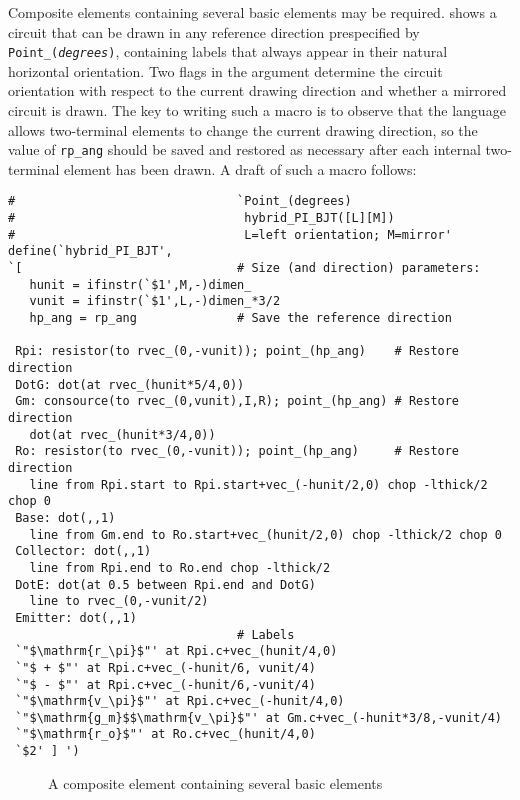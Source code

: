Composite elements containing several basic elements may be
required.   shows a circuit that can be drawn in
any reference direction prespecified by {\tt Point\_({\sl degrees})},
containing labels that always appear in their natural horizontal orientation.
Two flags in the argument determine the circuit orientation with respect to
the current drawing direction and whether a mirrored circuit is drawn.  
The key to writing such a macro is to observe that the \pic language
allows two-terminal elements to change the current drawing direction,
so the value of {\tt rp\_ang} should be saved and restored as necessary
after each internal two-terminal element has been drawn.
A draft of such a macro follows:
\begin{verbatim}
#                               `Point_(degrees)
#                                hybrid_PI_BJT([L][M])
#                                L=left orientation; M=mirror'
define(`hybrid_PI_BJT',
`[                              # Size (and direction) parameters:
   hunit = ifinstr(`$1',M,-)dimen_
   vunit = ifinstr(`$1',L,-)dimen_*3/2
   hp_ang = rp_ang              # Save the reference direction

 Rpi: resistor(to rvec_(0,-vunit)); point_(hp_ang)    # Restore direction
 DotG: dot(at rvec_(hunit*5/4,0))
 Gm: consource(to rvec_(0,vunit),I,R); point_(hp_ang) # Restore direction
   dot(at rvec_(hunit*3/4,0))
 Ro: resistor(to rvec_(0,-vunit)); point_(hp_ang)     # Restore direction
   line from Rpi.start to Rpi.start+vec_(-hunit/2,0) chop -lthick/2 chop 0
 Base: dot(,,1)
   line from Gm.end to Ro.start+vec_(hunit/2,0) chop -lthick/2 chop 0
 Collector: dot(,,1)
   line from Rpi.end to Ro.end chop -lthick/2
 DotE: dot(at 0.5 between Rpi.end and DotG)
   line to rvec_(0,-vunit/2)
 Emitter: dot(,,1)
                                # Labels
 `"$\mathrm{r_\pi}$"' at Rpi.c+vec_(hunit/4,0)
 `"$ + $"' at Rpi.c+vec_(-hunit/6, vunit/4)
 `"$ - $"' at Rpi.c+vec_(-hunit/6,-vunit/4)
 `"$\mathrm{v_\pi}$"' at Rpi.c+vec_(-hunit/4,0)
 `"$\mathrm{g_m}$$\mathrm{v_\pi}$"' at Gm.c+vec_(-hunit*3/8,-vunit/4)
 `"$\mathrm{r_o}$"' at Ro.c+vec_(hunit/4,0)
 `$2' ] ')
\end{verbatim}
\begin{figure}[h!t]
   \vspace*{-0.5ex}
   
   \vspace*{-0.5ex}
   \caption{A composite element containing several basic elements}
   \label{HybridPi}
   \end{figure}

